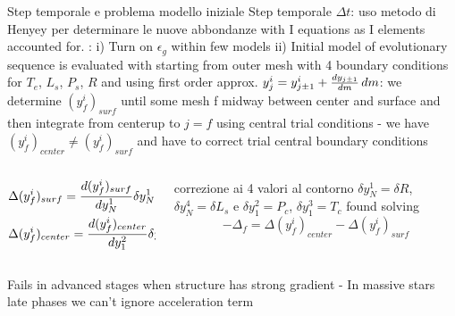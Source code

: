 \begin{frame}{Step temporale e problema modello iniziale}
Step temporale $\Delta t$: uso metodo di Henyey per determinare le nuove abbondanze with I equations as I elements accounted for.
: i) Turn on $\epsilon_g$ within few models ii) Initial model of evolutionary sequence is evaluated with 
starting from outer mesh with 4 boundary conditions for $T_e$, $L_s$, $P_s$, $R$ and using first order approx. $y_j^i=y_{j\pm1}^i+\TDy{m}{y_{j\pm1}}\,dm$: we determine $(y_f^i)_{surf}$ until some mesh f midway between center and surface and then integrate from centerup to $j=f$ using central trial conditions - we have $(y_f^i)_{center}\neq(y_f^i)_{surf}$ and have to correct trial central boundary conditions
\begin{columns}[T]
	\begin{column}{0.5\textwidth}
\begin{align*}
&\Delta(y_f^i)_{surf}=\TDy{y_N^1}{(y^i_f)_{surf}}\delta y_N^1+\TDy{y_N^4}{(y^i_f)_{surf}}\delta y_N^4\\
&\Delta(y_f^i)_{center}=\TDy{y_1^2}{(y^i_f)_{center}}\delta y_1^2+\TDy{y_1^3}{(y^i_f)_{center}}\delta y_1^3
\end{align*}
	\end{column}
	\begin{column}{0.45\textwidth}
correzione ai 4 valori al contorno $\delta y_N^1=\delta R$, $\delta y_N^4=\delta L_s$ e $\delta y_1^2=P_c$, $\delta y_1^3=T_c$ found solving \[-\Delta_f=\Delta(y_f^i)_{center}-\Delta(y_f^i)_{surf}\]
	\end{column}
\end{columns}
Fails in advanced stages when structure has strong gradient - In massive stars late phases we can't ignore acceleration term
\end{frame}
